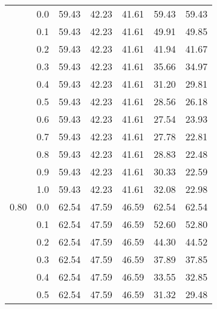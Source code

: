 \begin{longtable}{lp{2cm}|p{2cm}p{2cm}p{2cm}p{2cm}p{2cm}}
\bottomrule
\endlastfoot
0.70 & 0.0 &       59.43 &             42.23 &                41.61 &                59.43 &           59.43 \\
     & 0.1 &       59.43 &             42.23 &                41.61 &                49.91 &           49.85 \\
     & 0.2 &       59.43 &             42.23 &                41.61 &                41.94 &           41.67 \\
     & 0.3 &       59.43 &             42.23 &                41.61 &                35.66 &           34.97 \\
     & 0.4 &       59.43 &             42.23 &                41.61 &                31.20 &           29.81 \\
     & 0.5 &       59.43 &             42.23 &                41.61 &                28.56 &           26.18 \\
     & 0.6 &       59.43 &             42.23 &                41.61 &                27.54 &           23.93 \\
     & 0.7 &       59.43 &             42.23 &                41.61 &                27.78 &           22.81 \\
     & 0.8 &       59.43 &             42.23 &                41.61 &                28.83 &           22.48 \\
     & 0.9 &       59.43 &             42.23 &                41.61 &                30.33 &           22.59 \\
     & 1.0 &       59.43 &             42.23 &                41.61 &                32.08 &           22.98 \\
0.80 & 0.0 &       62.54 &             47.59 &                46.59 &                62.54 &           62.54 \\
     & 0.1 &       62.54 &             47.59 &                46.59 &                52.60 &           52.80 \\
     & 0.2 &       62.54 &             47.59 &                46.59 &                44.30 &           44.52 \\
     & 0.3 &       62.54 &             47.59 &                46.59 &                37.89 &           37.85 \\
     & 0.4 &       62.54 &             47.59 &                46.59 &                33.55 &           32.85 \\
     & 0.5 &       62.54 &             47.59 &                46.59 &                31.32 &           29.48 \\

\end{longtable}
